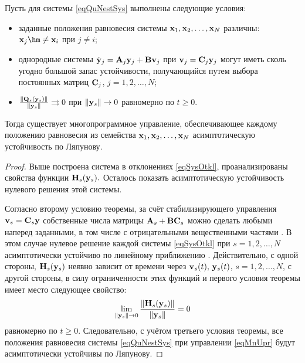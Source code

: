 \begin{theorem}
Пусть для системы \eqref{eqQuNestSys} выполнены следующие условия\/{\rm :}
\begin{itemize}
\item[\rm 1)] заданные положения равновесия системы ${\bf x}_1, {\bf x}_2,  \ldots, {\bf x}_N$
различны\/{\rm :} ${\bf x}_j\hm\neq{\bf x}_i$ при $j\neq i$\/{\rm ;}

\item[\rm 2)] однородные системы $\dot{\bf y}_j={\bf A}_j{\bf y}_j+{\bf B}{\bf v}_j$ при
${\bf v}_j={\bf C}_j{\bf y}_j$ могут иметь сколь угодно большой запас
устойчивости{\rm ,} получающийся путем выбора постоянных матриц ${\bf C}_j${\rm ,}
$j=1, 2, \dots, N$\/{\rm ;}

\item[\rm 3)] $\frac{\|{\bf Q}_s({\bf y}_s)\|}{\|{\bf y}_s\|}\rightrightarrows0$ при
$\|{\bf y}_s\|\rightarrow 0$ равномерно по $t\geq 0${\rm .}
\end{itemize}


Тогда существует многопрограммное управление{\rm ,} обеспечивающее
каждому положению равновесия из семейства ${\bf x}_1, {\bf x}_2, \ldots, {\bf x}_N$
асимптотическую устойчивость по Ляпунову{\rm .}
\end{theorem}

\begin{proof}
Выше построена система в отклонениях \eqref{eqSysOtkl},
проанализированы свойства функции $\mathbf{H}_s({\bf y}_s).$ Осталось
показать асимптотическую устойчивость нулевого решения этой
системы.

Согласно второму условию теоремы, за счёт стабилизирующего
управления ${\bf v}_s={\bf C}_s{\bf y}$ собственные числа матрицы
$\mathbf{A}_s+{\bf B}{\bf C}_s$ можно сделать любыми наперед заданными, в
том числе с отрицательными вещественными частями \cite{sha:bib:1}. В этом
случае нулевое решение каждой системы \eqref{eqSysOtkl} при
$s=1, 2, \dots, N$ асимптотически устойчиво по линейному
приближению \cite{sha:bib:4}. Действительно, с одной стороны,
$\mathbf{H}_s({\bf y}_s)$ неявно зависит от времени через
${\bf v}_s(t),\,{\bf y}_s(t)$, $s=1, 2, \dots, N$, с другой стороны, в
силу ограниченности этих функций и первого условия теоремы имеет
место следующее свойство:
$$\lim_{\|{\bf y}_s\|\rightarrow{0}}{\|\mathbf{H}_s({\bf y}_s)\|\over\|{\bf y}_s\|}=0$$
равномерно по $t\geq{0}$. Следовательно, с учётом третьего условия
теоремы, все положения равновесия системы \eqref{eqQuNestSys} при
управлении \eqref{eqMnUpr} будут асимптотически устойчивы по
Ляпунову.
\end{proof}


